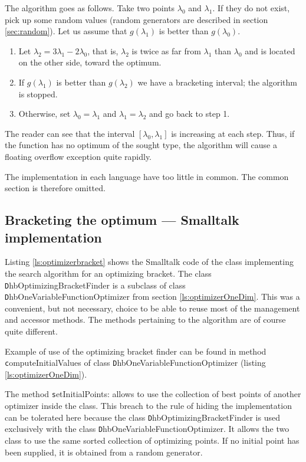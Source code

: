 The algorithm goes as follows. Take two points $\lambda_0$ and
$\lambda_1$. If they do not exist, pick up some random values
(random generators are described in section \ref{sec:random}). Let
us assume that $g\left(\lambda_1\right)$ is better than
$g\left(\lambda_0\right)$.
\begin{enumerate}
  \item Let $\lambda_2=3\lambda_1-2\lambda_0$, that is, $\lambda_2$ is twice as far from $\lambda_1$ than
$\lambda_0$ and is located on the other side, toward the optimum.
  \item If $g\left(\lambda_1\right)$ is better than
$g\left(\lambda_2\right)$ we have a bracketing interval; the
algorithm is stopped.
  \item Otherwise, set $\lambda_0=\lambda_1$ and $\lambda_1=\lambda_2$ and go back to step 1.
\end{enumerate}
The reader can see that the interval
$\left[\lambda_0,\lambda_1\right]$ is increasing at each step.
Thus, if the function has no optimum of the sought type, the
algorithm will cause a floating overflow exception quite rapidly.

\noindent The implementation in each language have too little in
common. The common section is therefore omitted.

\subsection{Bracketing the optimum --- Smalltalk implementation}
\label{sec:sbracket}  Listing
\ref{ls:optimizerbracket} shows the Smalltalk code of the class
implementing the search algorithm for an optimizing bracket. The
class {\texttt DhbOptimizingBracketFinder} is a subclass of class {\texttt
DhbOneVariableFunctionOptimizer} from section
\ref{ls:optimizerOneDim}. This was a convenient, but not
necessary, choice to be able to reuse most of the management and
accessor methods. The methods pertaining to the algorithm are of
course quite different.

Example of use of the optimizing bracket finder can be found in
method {\texttt computeInitialValues} of class {\texttt
DhbOneVariableFunctionOptimizer} (\cf listing
\ref{ls:optimizerOneDim}).

The method {\texttt setInitialPoints:} allows to use the collection of
best points of another optimizer inside the class. This breach to
the rule of hiding the implementation can be tolerated here
because the class {\texttt DhbOptimizingBracketFinder} is used
exclusively with the class {\texttt DhbOneVariableFunctionOptimizer}.
It allows the two class to use the same sorted collection of
optimizing points. If no initial point has been supplied, it is
obtained from a random generator.

